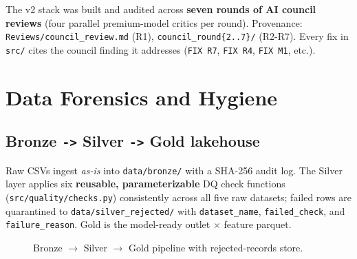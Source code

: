 \documentclass[10pt,a4paper]{article}
\begin{document}
\vspace{0.6cm}

\begin{findingbox}[title=\textbf{Build trail}]
The v2 stack was built and audited across \textbf{seven rounds of AI council
reviews} (four parallel premium-model critics per round). Provenance:
\texttt{Reviews/council\_review.md} (R1), \texttt{council\_round\{2..7\}/}
(R2-R7). Every fix in \texttt{src/} cites the council finding it addresses
(\texttt{FIX R7}, \texttt{FIX R4}, \texttt{FIX M1}, etc.).
\end{findingbox}

\newpage
\section{Data Forensics and Hygiene}

\subsection{Bronze \texttt{->} Silver \texttt{->} Gold lakehouse}

Raw CSVs ingest \emph{as-is} into \texttt{data/bronze/} with a SHA-256 audit log.
The Silver layer applies six \textbf{reusable, parameterizable} DQ check
functions (\texttt{src/quality/checks.py}) consistently across all five raw
datasets; failed rows are quarantined to \texttt{data/silver\_rejected/} with
\texttt{dataset\_name}, \texttt{failed\_check}, and \texttt{failure\_reason}.
Gold is the model-ready outlet $\times$ feature parquet.

\begin{figure}[H]
\centering
{}
\vspace{-0.4em}
\caption{Bronze $\to$ Silver $\to$ Gold pipeline with rejected-records store.}
\end{figure}
\end{document}
